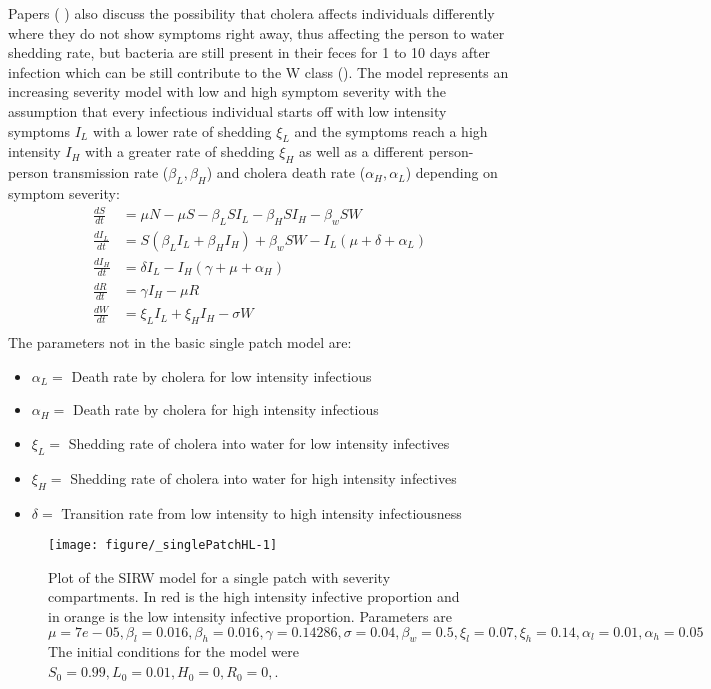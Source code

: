 \documentclass[12pt]{article}\usepackage[]{graphicx}\usepackage[]{color}
\makeatletter
\def\maxwidth{ %
  \ifdim\Gin@nat@width>\linewidth
    \linewidth
  \else
    \Gin@nat@width
  \fi
}
\newenvironment{knitrout}{}{} %
\makeatother
\begin{document}
Papers (\cite{link15} \cite{link18}) also discuss the possibility that cholera affects individuals differently where they do not show symptoms right away, thus affecting the person to water shedding rate, but bacteria are still present in their feces for 1 to 10 days after infection which can be still contribute to the W class (\cite{link15}).
The model represents an increasing severity model with low and high symptom severity with the assumption that every infectious individual starts off with low intensity symptoms $I_L$ with a lower rate of shedding $\xi_L$ and the symptoms reach a high intensity $I_H$ with a greater rate of shedding $\xi_H$ as well as a different person-person transmission rate ($\beta_L, \beta_H$) and cholera death rate ($\alpha_H, \alpha_L$) depending on symptom severity:
\begin{align*}
    \frac{dS}{dt}&= \mu N - \mu S - \beta_L S I_L - \beta_H S I_H - \beta_w S W  \\
    \frac{dI_L}{dt}&= S(\beta_L I_L + \beta_H I_H) + \beta_w S W - I_L (\mu + \delta + \alpha_L) \\
    \frac{dI_H}{dt}&= \delta I_L - I_H (\gamma + \mu + \alpha_H) \\
    \frac{dR}{dt}&= \gamma I_H - \mu R \\
    \frac{dW}{dt}&= \xi_L I_L + \xi_H I_H  - \sigma W\\
\end{align*}
The parameters not in the basic single patch model are:
\begin{itemize}
	\item $\alpha_L=$ Death rate by cholera for low intensity infectious
	\item $\alpha_H=$ Death rate by cholera for high intensity infectious
    \item $\xi_L=$ Shedding rate of cholera into water for low intensity infectives
    \item $\xi_H=$ Shedding rate of cholera into water for high intensity infectives
	\item $\delta=$ Transition rate from low intensity to high intensity infectiousness
\end{itemize}

\begin{knitrout}
\color{fgcolor}\begin{figure}[h]
\texttt{[image: figure/\_singlePatchHL-1]} \caption{\label{fig:basesp} Plot of the SIRW model for a single patch with severity compartments. In red is the high intensity infective proportion and in orange is the low intensity infective proportion. Parameters are $\mu=7e-05,\beta_l=0.016,\beta_h=0.016,\gamma=0.14286,\sigma=0.04,\beta_w=0.5,\xi_l=0.07,\xi_h=0.14,\alpha_l=0.01,\alpha_h=0.05$ The initial conditions for the model were $S_0=0.99,L_0=0.01,H_0=0,R_0=0,$.}\label{fig:<singlePatchHL}
\end{figure}


\end{knitrout}
\FloatBarrier
\end{document}
